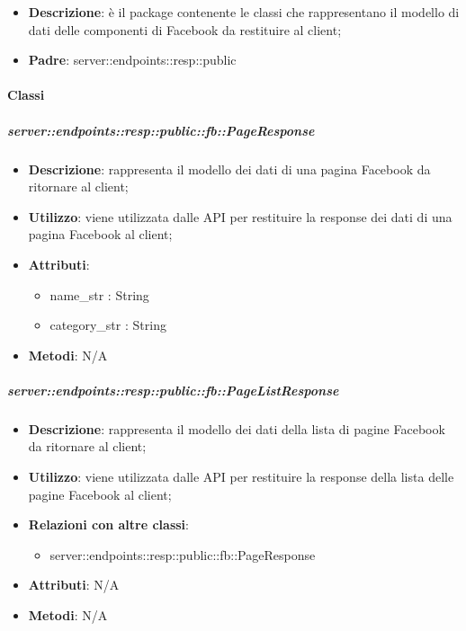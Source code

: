 \begin{itemize}
  \item \textbf{Descrizione}: è il package contenente le classi che rappresentano il modello di dati delle componenti di Facebook da restituire al client;
  \item \textbf{Padre}: server::endpoints::resp::public
\end{itemize}

	\paragraph{Classi} %

    \subparagraph{server::endpoints::resp::public::fb::PageResponse} %
    \label{subp:bdsm_app_server_endpoints_resp_public_fb_pageresponse}
    \begin{itemize}
      \item \textbf{Descrizione}: rappresenta il modello dei dati di una pagina Facebook da ritornare al client;
      \item \textbf{Utilizzo}: viene utilizzata dalle API per restituire la response dei dati di una pagina Facebook al client;
      
	  \item \textbf{Attributi}: 
	  	\begin{itemize}
	  		\item name\_str : String
	  		\item category\_str : String
	  	\end{itemize}
	  \item \textbf{Metodi}: N/A
      \end{itemize}

    \subparagraph{server::endpoints::resp::public::fb::PageListResponse} %
    \label{subp:bdsm_app_server_endpoints_resp_public_fb_pagelistresponse}
    \begin{itemize}
      \item \textbf{Descrizione}: rappresenta il modello dei dati della lista di pagine Facebook da ritornare al client;
      \item \textbf{Utilizzo}: viene utilizzata dalle API per restituire la response della lista delle pagine Facebook al client;
      \item \textbf{Relazioni con altre classi}:
        \begin{itemize}
          \item server::endpoints::resp::public::fb::PageResponse
        \end{itemize}
	  \item \textbf{Attributi}: N/A
	  \item \textbf{Metodi}: N/A
      \end{itemize}

